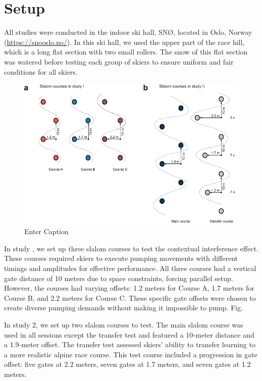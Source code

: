 \section{Setup}
All studies were conducted in the indoor ski hall, SNØ, located in Oslo, Norway (\url{https://snooslo.no/}). In this ski hall, we used the upper part of the race hill, which is a long flat section with two small rollers. The snow of this flat section was watered before testing each group of skiers to ensure uniform and fair conditions for all skiers. 

\begin{figure}
    \centering
    \includegraphics[width=1\linewidth]{figure/figure_methods_courses2.pdf}
    \caption{Enter Caption}
    \label{fig:enter-label}
\end{figure}

In study , we set up three slalom courses to test the contextual interference effect. These courses required skiers to execute pumping movements with different timings and amplitudes for effective performance. All three courses had a vertical gate distance of 10 meters due to space constraints, forcing parallel setup. However, the courses had varying offsets: 1.2 meters for Course A, 1.7 meters for Course B, and 2.2 meters for Course C. These specific gate offsets were chosen to create diverse pumping demands without making it impossible to pump. Fig. 

In study 2, we set up two slalom courses to test. The main slalom course was used in all sessions except the transfer test and featured a 10-meter distance and a 1.9-meter offset. The transfer test assessed skiers' ability to transfer learning to a more realistic alpine race course. This test course included a progression in gate offset: five gates at 2.2 meters, seven gates at 1.7 meters, and seven gates at 1.2 meters. 

